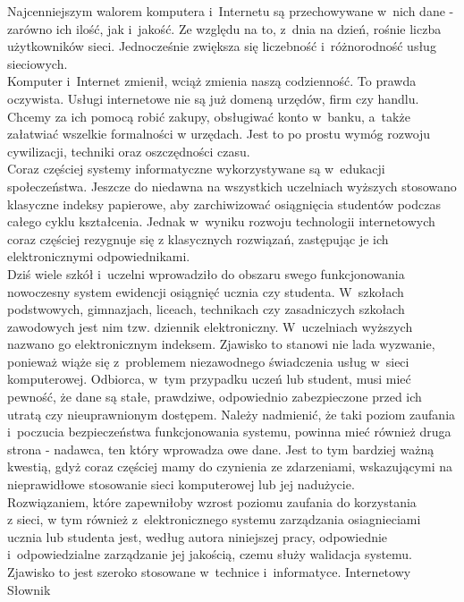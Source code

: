 \documentclass{xmgr}
\begin{document}
\indent \indent Najcenniejszym walorem komputera i~Internetu są przechowywane w~nich dane - zarówno
ich ilość, jak i~jakość. Ze względu na to, z~dnia na dzień, rośnie liczba
użytkowników sieci. Jednocześnie zwiększa się liczebność i~różnorodność usług
sieciowych.
\\
\indent Komputer i~Internet zmienił, wciąż zmienia naszą codzienność. To prawda oczywista.
Usługi internetowe nie są już domeną urzędów, firm czy handlu. Chcemy za ich pomocą
robić zakupy, obsługiwać konto w~banku, a~także załatwiać wszelkie formalności w
urzędach. Jest to po prostu wymóg rozwoju cywilizacji, techniki oraz oszczędności
czasu.
\\
\indent Coraz częściej systemy informatyczne wykorzystywane są w~edukacji społeczeństwa.
Jeszcze do niedawna na wszystkich uczelniach wyższych stosowano klasyczne indeksy
papierowe, aby zarchiwizować osiągnięcia studentów podczas całego cyklu kształcenia.
Jednak w~wyniku rozwoju technologii internetowych coraz częściej rezygnuje się
z klasycznych rozwiązań, zastępując je ich elektronicznymi odpowiednikami.
\\
\indent Dziś wiele szkół i~uczelni wprowadziło do obszaru swego funkcjonowania nowoczesny
system ewidencji osiągnięć ucznia czy studenta. W~szkołach podstwowych, gimnazjach,
liceach, technikach czy zasadniczych szkołach zawodowych jest nim tzw. dziennik
elektroniczny. W~uczelniach wyższych  nazwano go elektronicznym indeksem. Zjawisko
to stanowi nie lada wyzwanie, ponieważ wiąże się z~problemem niezawodnego świadczenia
usług w~sieci komputerowej. Odbiorca, w~tym przypadku uczeń lub student, musi mieć
pewność, że dane są stałe, prawdziwe, odpowiednio zabezpieczone przed ich utratą
czy nieuprawnionym dostępem. Należy nadmienić, że taki poziom zaufania i~poczucia
bezpieczeństwa funkcjonowania systemu, powinna mieć również druga strona - nadawca,
ten który wprowadza owe dane. Jest to tym bardziej ważną kwestią, gdyż coraz częściej
mamy do czynienia ze zdarzeniami, wskazującymi na nieprawidłowe stosowanie sieci
komputerowej lub jej nadużycie.
\\
\indent Rozwiązaniem, które zapewniłoby wzrost poziomu zaufania do korzystania
\\
z sieci,
w tym również z~elektronicznego systemu zarządzania osiagnieciami ucznia lub studenta
jest, według autora niniejszej pracy, odpowiednie i~odpowiedzialne zarządzanie jej
jakością, czemu służy walidacja systemu.
\\
\indent Zjawisko to jest szeroko stosowane w~technice i~informatyce. Internetowy Słownik
\end{document}

